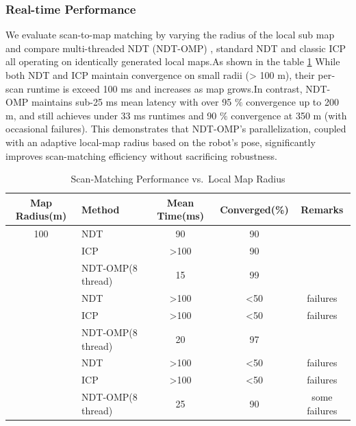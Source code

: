 \subsubsection{Real-time Performance }



We evaluate  scan-to-map matching by varying the radius of the local sub map and compare multi-threaded
NDT (NDT-OMP) , standard NDT and classic ICP all operating on identically generated local maps.As shown in the table \ref{tab:scanmap_radius} While both NDT and ICP maintain convergence on small radii (> 100 m), their per‐scan runtime  is exceed 100 ms and increases as map grows.In contrast, NDT-OMP maintains sub-25 ms mean latency with over 95 $\%$ convergence up to 200 m, and still achieves under 33 ms runtimes and 90 $\%$ convergence at 350 m (with occasional failures). This demonstrates that NDT-OMP’s parallelization, coupled with an adaptive local-map radius based on the robot’s pose, significantly improves scan-matching efficiency without sacrificing robustness.



\begin{table}[H]
	\centering
	\caption{Scan‐Matching Performance vs.\ Local Map Radius}
	\renewcommand{\arraystretch}{0.5}
	\setlength{\tabcolsep}{1pt}
	\label{tab:scanmap_radius}
	\begin{tabular}{c l c c c}
		\toprule
		\textbf{Map Radius(m)} & \textbf{Method} & \textbf{Mean Time(ms)} & \textbf{Converged(\%)} & \textbf{Remarks} \\
		\midrule
		100 & NDT     & 90  & 90 &  \\
		& ICP     & >100  & 90 &             \\
		& NDT‐OMP(8 thread) &  15  & 99 &     \\
			\midrule
		\addlinespace
		200 & NDT     & >100  & <50 &  failures           \\
		& ICP     & >100  & <50&       failures     \\
		& NDT‐OMP(8 thread) & 20  & 97 &            \\
			\midrule
		\addlinespace
		350 & NDT     & >100  & <50 &  failures \\
		& ICP     & >100 &     <50 &  failures          \\
		& NDT‐OMP(8 thread) & 25  & 90 &  some failures     \\
		\bottomrule
	\end{tabular}
\end{table}

